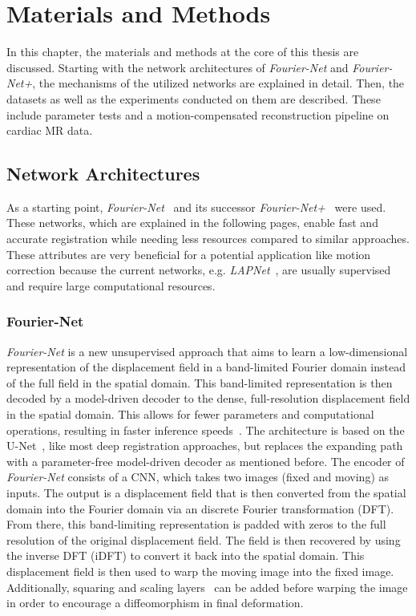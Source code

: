 
\chapter{Materials and Methods} \label{Ch:MasterialsAndMethods}
In this chapter, the materials and methods at the core of this thesis are discussed. Starting with the network architectures of \emph{Fourier-Net} and \emph{Fourier-Net+}, the mechanisms of the utilized networks are explained in detail. Then, the datasets as well as the experiments conducted on them are described. These include parameter tests and a motion-compensated reconstruction pipeline on cardiac MR data.

\section{Network Architectures} \label{Sec:NetworkArchitecture}
As a starting point, \emph{Fourier-Net}~\cite{Fourier-Net} and its successor \emph{Fourier-Net+}~\cite{Fourier-Net+} were used. These networks, which are explained in the following pages, enable fast and accurate registration while needing less resources compared to similar approaches. These attributes are very beneficial for a potential application like motion correction because the current networks, e.g. \emph{LAPNet}~\cite{LAPNet}, are usually supervised and require large computational resources.

\subsection{Fourier-Net}	\label{SubSec:Fourier-Net}
\emph{Fourier-Net} is a new unsupervised approach that aims to learn a low-dimensional representation of the displacement field in a band-limited Fourier domain instead of the full field in the spatial domain. This band-limited representation is then decoded by a model-driven decoder to the dense, full-resolution displacement field in the spatial domain. This allows for fewer parameters and computational operations, resulting in faster inference speeds~\cite{Fourier-Net}. The architecture is based on the U-Net~\cite{U-Net}, like most deep registration approaches, but replaces the expanding path with a parameter-free model-driven decoder as mentioned before. The encoder of \emph{Fourier-Net} consists of a CNN, which takes two images (fixed and moving) as inputs. The output is a displacement field that is then converted from the spatial domain into the Fourier domain via an discrete Fourier transformation (DFT). From there, this band-limiting representation 
is padded with zeros to the full resolution of the original displacement field. The field is then recovered by using the inverse DFT (iDFT) to convert it back into the spatial domain. This displacement field is then used to warp the moving image into the fixed image. Additionally, squaring and scaling layers~\cite{Dalca2018} can be added before warping the image in order to encourage a diffeomorphism in final deformation. 

